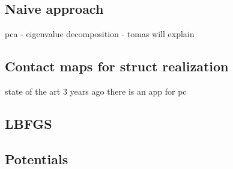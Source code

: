    
        
        

\subsection{Naive approach}
pca - eigenvalue decomposition - tomas will explain
\subsection{Contact maps for struct realization}
state of the art 3 years ago
there is an app for pc
\subsection{LBFGS}
\subsection{Potentials}
